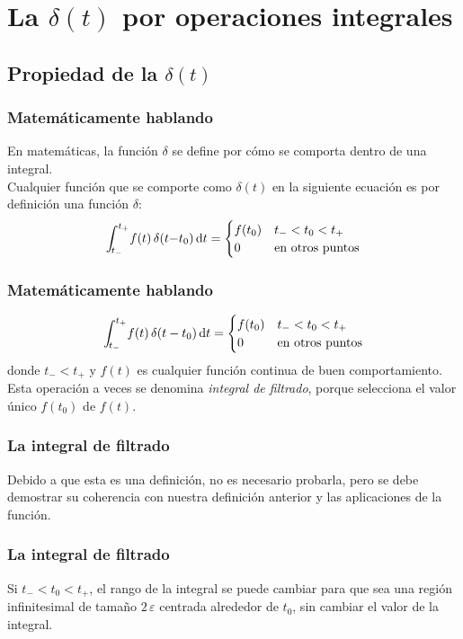 \documentclass[12pt]{beamer}
\begin{document}
\section{La \texorpdfstring{$\delta(t)$}{d(t)} por operaciones integrales}
\subsection{Propiedad de la \texorpdfstring{$\delta(t)$}{d(t)}}

\begin{frame}
\frametitle{Matemáticamente hablando}
En matemáticas, la función $\delta$ se define por cómo se comporta dentro de una integral.
\\
\bigskip
\pause
Cualquier función que se comporte como $\delta (t)$ en la siguiente ecuación es por definición una función $\delta$:
\pause
\begin{align}
\scaleint{5ex}_{\bs t_{-}}^{t_{+}} f(t) \, \delta(t {-} t_{0}) \dd{t} = \begin{cases}
f(t_{0}) & t_{-} < t_{0}  < t_{+} \\
0 & \mbox{en otros puntos}
\end{cases}
\label{eq:ecuacion_05_14}
\end{align}
\end{frame}
\begin{frame}
\frametitle{Matemáticamente hablando}
\begin{align*}
\scaleint{5ex}_{\bs t_{-}}^{t_{+}} f(t) \, \delta(t - t_{0}) \dd{t} = \begin{cases}
f(t_{0}) & t_{-} < t_{0}  < t_{+} \\
0 & \mbox{en otros puntos}
\end{cases}
\end{align*}        
donde $t_{-} < t_{+}$ y $f (t)$ es cualquier función continua de buen comportamiento.
\\
\bigskip
\pause
Esta operación a veces se denomina \emph{integral de filtrado}, porque selecciona el valor único $f(t_{0})$ de $f(t)$.
\end{frame}
\begin{frame}
\frametitle{La integral de filtrado}
Debido a que esta es una definición, no es necesario probarla, pero se debe demostrar su coherencia con nuestra definición anterior y las aplicaciones de la función.
\end{frame}
\begin{frame}
\frametitle{La integral de filtrado}
Si $t_{-} < t_{0}  < t_{+}$, el rango de la integral se puede cambiar para que sea una región infinitesimal de tamaño $2 \, \varepsilon$ centrada alrededor de $t_{0}$, sin cambiar el valor de la integral.
\end{frame}
\end{document}
